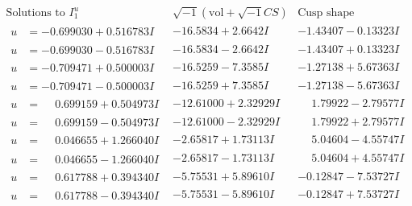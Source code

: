 \documentclass[1p]{elsarticle_modified}
\theoremstyle{definition}
\newcommand{\I}{\sqrt{-1}}
\begin{document}
$$\begin{array}{c|c|c}  
\text{Solutions to }I^u_{1}& \I (\text{vol} + \sqrt{-1}CS) & \text{Cusp shape}\\
 \hline 
\begin{aligned}
u &= -0.699030 + 0.516783 I\end{aligned}
 & -16.5834 + 2.6642 I & -1.43407 - 0.13323 I \\ \hline\begin{aligned}
u &= -0.699030 - 0.516783 I\end{aligned}
 & -16.5834 - 2.6642 I & -1.43407 + 0.13323 I \\ \hline\begin{aligned}
u &= -0.709471 + 0.500003 I\end{aligned}
 & -16.5259 - 7.3585 I & -1.27138 + 5.67363 I \\ \hline\begin{aligned}
u &= -0.709471 - 0.500003 I\end{aligned}
 & -16.5259 + 7.3585 I & -1.27138 - 5.67363 I \\ \hline\begin{aligned}
u &= \phantom{-}0.699159 + 0.504973 I\end{aligned}
 & -12.61000 + 2.32929 I & \phantom{-}1.79922 - 2.79577 I \\ \hline\begin{aligned}
u &= \phantom{-}0.699159 - 0.504973 I\end{aligned}
 & -12.61000 - 2.32929 I & \phantom{-}1.79922 + 2.79577 I \\ \hline\begin{aligned}
u &= \phantom{-}0.046655 + 1.266040 I\end{aligned}
 & -2.65817 + 1.73113 I & \phantom{-}5.04604 - 4.55747 I \\ \hline\begin{aligned}
u &= \phantom{-}0.046655 - 1.266040 I\end{aligned}
 & -2.65817 - 1.73113 I & \phantom{-}5.04604 + 4.55747 I \\ \hline\begin{aligned}
u &= \phantom{-}0.617788 + 0.394340 I\end{aligned}
 & -5.75531 + 5.89610 I & -0.12847 - 7.53727 I \\ \hline\begin{aligned}
u &= \phantom{-}0.617788 - 0.394340 I\end{aligned}
 & -5.75531 - 5.89610 I & -0.12847 + 7.53727 I \\ \hline\begin{aligned}

\end{aligned}
\end{array}$$
\end{document}
